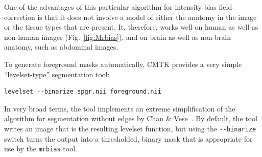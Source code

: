 \documentclass{InsightArticle}
\begin{document}
One of the advantages of this particular algorithm for intensity bias field
correction is that it does not involve a model of either the anatomy in the
image or the tissue types that are present. It, therefore, works well on human
as well as non-human images (Fig.~\ref{fig:Mrbias}), and on brain as well as
non-brain anatomy, such as abdominal images.

To generate foreground masks automatically, CMTK provides a very simple
``levelset-type'' segmentation tool: 
\begin{verbatim}
levelset --binarize spgr.nii foreground.nii
\end{verbatim}
In very broad terms, the tool implements an extreme simplification of the
algorithm for segmentation without edges by Chan \&
Vese~\cite{ChanVese:2001}. By default, the tool writes an image that is the
resulting levelset function, but using the \verb|--binarize| switch turns the
output into a thresholded, binary mask that is appropriate for use by the
\verb|mrbias| tool.
\end{document}
